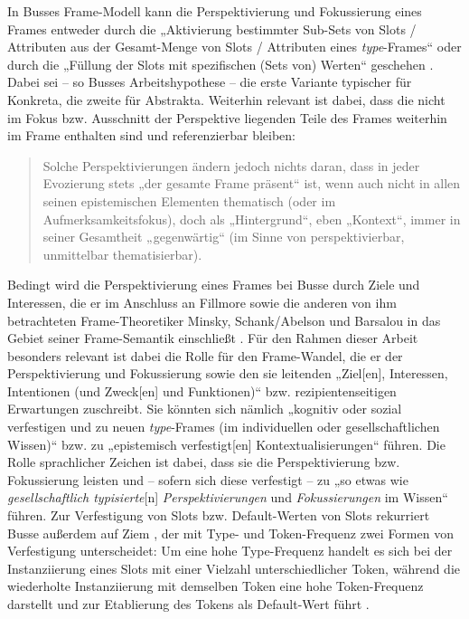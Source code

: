 In Busses Frame-Modell kann die Perspektivierung und Fokussierung eines Frames entweder durch die „Aktivierung bestimmter Sub-Sets von Slots / Attributen aus der Gesamt-Menge von Slots / Attributen eines \emph{type}-Frames`` oder durch die „Füllung der Slots mit spezifischen (Sets von) Werten`` geschehen \autocite[622]{busseFrameSemantikKompendium2012}. Dabei sei -- so Busses Arbeitshypothese -- die erste Variante typischer für Konkreta, die zweite für Abstrakta. Weiterhin relevant ist dabei, dass die nicht im Fokus bzw. Ausschnitt der Perspektive liegenden Teile des Frames weiterhin im Frame enthalten sind und referenzierbar bleiben:

\begin{quote}
Solche Perspektivierungen ändern jedoch nichts daran, dass in jeder Evozierung stets „der gesamte Frame präsent`` ist, wenn auch nicht in allen seinen epistemischen Elementen thematisch (oder im Aufmerksamkeitsfokus), doch als „Hintergrund``, eben „Kontext``, immer in seiner Gesamtheit „gegenwärtig`` (im Sinne von perspektivierbar, unmittelbar thematisierbar). \autocite[664]{busseFrameSemantikKompendium2012}
\end{quote}

Bedingt wird die Perspektivierung eines Frames bei Busse durch Ziele und Interessen, die er im Anschluss an Fillmore sowie die anderen von ihm betrachteten Frame-Theoretiker Minsky, Schank{\slash}Abelson und Barsalou in das Gebiet seiner Frame-Semantik einschließt \autocite*[620-621]{busseFrameSemantikKompendium2012}. Für den Rahmen dieser Arbeit besonders relevant ist dabei die Rolle für den Frame-Wandel, die er der Perspektivierung und Fokussierung sowie den sie leitenden „Ziel{[}en{]}, Interessen, Intentionen (und Zweck{[}en{]} und Funktionen)`` \autocite*[622]{busseFrameSemantikKompendium2012} bzw. rezipientenseitigen Erwartungen zuschreibt. Sie könnten sich nämlich „kognitiv oder sozial verfestigen und zu neuen \emph{type}-Frames (im individuellen oder gesellschaftlichen Wissen)`` bzw. zu „epistemisch verfestigt{[}en{]} Kontextualisierungen`` \autocite*[622]{busseFrameSemantikKompendium2012} führen. Die Rolle sprachlicher Zeichen ist dabei, dass sie die Perspektivierung bzw. Fokussierung leisten und -- sofern sich diese verfestigt -- zu „so etwas wie \emph{gesellschaftlich typisierte}{[}n{]} \emph{Perspektivierungen} und \emph{Fokussierungen} im Wissen`` \autocite[623]{busseFrameSemantikKompendium2012} führen. Zur Verfestigung von Slots bzw. Default-Werten von Slots rekurriert Busse außerdem auf Ziem \autocite*{ziemFramesUndSprachliches2008}, der mit Type- und Token-Frequenz zwei Formen von Verfestigung unterscheidet: Um eine hohe Type-Frequenz handelt es sich bei der Instanziierung eines Slots mit einer Vielzahl unterschiedlicher Token, während die wiederholte Instanziierung mit demselben Token eine hohe Token-Frequenz darstellt und zur Etablierung des Tokens als Default-Wert führt \autocite[627]{busseFrameSemantikKompendium2012}.

